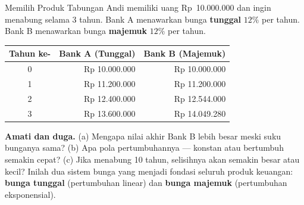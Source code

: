 \documentclass[11pt,a4paper]{report}
\theoremstyle{gaya}
\begin{document}
\begin{studikasus}{Memilih Produk Tabungan}
Andi memiliki uang Rp~10.000.000 dan ingin menabung selama 3 tahun. Bank A menawarkan bunga \textbf{tunggal} $12\%$ per tahun. Bank B menawarkan bunga \textbf{majemuk} $12\%$ per tahun.

\smallskip
\begin{center}
\begin{tabular}{c|r|r}
\toprule
Tahun ke- & Bank A (Tunggal) & Bank B (Majemuk) \\
\midrule
0 & Rp 10.000.000 & Rp 10.000.000 \\
1 & Rp 11.200.000 & Rp 11.200.000 \\
2 & Rp 12.400.000 & Rp 12.544.000 \\
3 & Rp 13.600.000 & Rp 14.049.280 \\
\bottomrule
\end{tabular}
\end{center}

\smallskip
\textbf{Amati dan duga.} (a) Mengapa nilai akhir Bank B lebih besar meski suku bunganya sama? (b) Apa pola pertumbuhannya --- konstan atau bertumbuh semakin cepat? (c) Jika menabung 10 tahun, selisihnya akan semakin besar atau kecil? Inilah dua sistem bunga yang menjadi fondasi seluruh produk keuangan: \textbf{bunga tunggal} (pertumbuhan linear) dan \textbf{bunga majemuk} (pertumbuhan eksponensial).
\end{studikasus}
\end{document}
